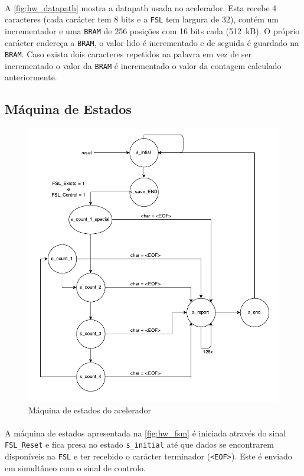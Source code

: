   \paragraph{} A \autoref{fig:hw_datapath} mostra a datapath usada no acelerador. Esta recebe 4 caracteres (cada carácter tem 8 bits e a \texttt{FSL} tem largura de 32), contém um incrementador e uma \texttt{BRAM} de 256 posições com 16 bits cada (512~kB). O próprio carácter endereça a \texttt{BRAM}, o valor lido é incrementado e de seguida é guardado na \texttt{BRAM}. Caso exista dois caracteres repetidos na palavra em vez de ser incrementado o valor da \texttt{BRAM} é incrementado o valor da contagem calculado anteriormente.

\subsection{Máquina de Estados}
  \begin{figure}[h]
    \centering
    \includegraphics[width=1.\textwidth]{img/fsm}
    \caption{Máquina de estados do acelerador}
    \label{fig:hw_fsm}
  \end{figure}

  \paragraph{} A máquina de estados apresentada na \autoref{fig:hw_fsm} é iniciada através do sinal \texttt{FSL\_Reset} e fica presa no estado \texttt{s\_initial} até que dados se encontrarem disponíveis na \texttt{FSL} e ter recebido o carácter terminador (\texttt{<EOF>}). Este é enviado em simultâneo com o sinal de controlo.

